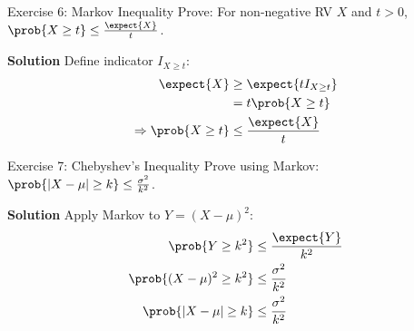 \documentclass[11pt,a4paper]{article}
\newenvironment{solution}
    {\par\medskip\noindent\textbf{\color{UMBlue}Solution}\quad\color{DarkGray}}
    {\par\medskip}
\begin{document}
\begin{exercisebox}{Exercise 6: Markov Inequality}
Prove: For non-negative RV $X$ and $t > 0$, $\prob{X \geq t} \leq \frac{\expect{X}}{t}$.

\begin{solution}
Define indicator $I_{X \geq t}$:
\begin{align*}
\expect{X} &\geq \expect{tI_{X \geq t}} \\
&= t\prob{X \geq t} \\
\Rightarrow \prob{X \geq t} &\leq \frac{\expect{X}}{t}
\end{align*}
\end{solution}
\end{exercisebox}

\begin{exercisebox}{Exercise 7: Chebyshev's Inequality}
Prove using Markov: $\prob{|X-\mu| \geq k} \leq \frac{\sigma^2}{k^2}$.

\begin{solution}
Apply Markov to $Y = (X-\mu)^2$:
\begin{align*}
\prob{Y \geq k^2} &\leq \frac{\expect{Y}}{k^2} \\
\prob{(X-\mu)^2 \geq k^2} &\leq \frac{\sigma^2}{k^2} \\
\prob{|X-\mu| \geq k} &\leq \frac{\sigma^2}{k^2}
\end{align*}
\end{solution}
\end{exercisebox}
\end{document}
